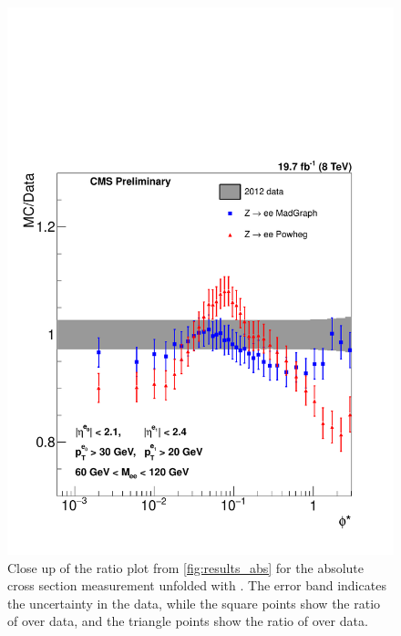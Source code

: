 \begin{figure}[!p]
    \centering
    \includegraphics[width=\textwidth]{figures/ZShape_Ratioelec_Abs_Dressed.pdf}
    \caption[
        Close up of the ratio plot from \cref{fig:results_abs} for the
        absolute cross section measurement unfolded with \MADGRAPH.
    ]{
        Close up of the ratio plot from \cref{fig:results_abs} for the
        absolute cross section measurement unfolded with \MADGRAPH. The error
        band indicates the uncertainty in the data, while the square points
        show the ratio of \MADGRAPH over data, and the triangle points show the
        ratio of \POWHEG over data.
    }
    \label{fig:results_ratio_abs}
\end{figure}
